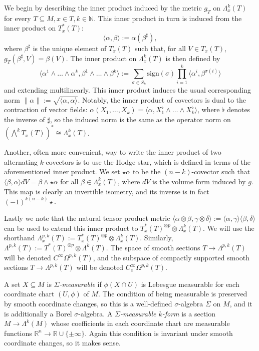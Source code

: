 \documentclass[11pt]{article}
\newcommand{\iprod}[1]{\langle #1 \rangle}
\begin{document}
We begin by describing the inner product induced by the metric $g_T$ on $\Lambda^k_x(T)$ for every $T \subseteq M, x \in T, k \in \mathbb{N}$. This inner product in turn is induced from the inner product on $T^*_x(T)$:
\[
\iprod{\alpha,\beta} := \alpha(\beta^\sharp),
\]
where $\beta^\sharp$ is the unique element of $T_x(T)$ such that, for all $V \in T_x(T)$, $g_T(\beta^\sharp,V) = \beta(V)$. The inner product on $\Lambda^k_x(T)$ is then defined by
\[
\iprod{\alpha^1\wedge\dots\wedge\alpha^k,\beta^1\wedge\dots\wedge\beta^k} := \sum_{\sigma \in S_k} \mathrm{sign}(\sigma)\prod_{i = 1}^k \iprod{\alpha^i,\beta^{\sigma(i)}}
\]
and extending multilinearly. This inner product induces the usual corresponding norm $\|\alpha\| := \sqrt{\iprod{\alpha,\alpha}}$.
 Notably, the inner product of covectors is dual to the contraction of vector fields: $\alpha(X_1,\dots,X_k) = \iprod{\alpha,X_1^\flat\wedge \dots \wedge X_k^\flat}$, where $\flat$ denotes the inverse of $\sharp$, so the induced norm is the same as the operator norm on $(\displaystyle\bigwedge^kT_x(T))^* \cong \Lambda^k_x(T)$. 
 
Another, often more convenient, way to write the inner product of two alternating $k$-covectors is to use the Hodge star, which is defined in terms of the aforementioned inner product. We set $\star \alpha$ to be the $(n-k)$-covector such that $\iprod{\beta,\alpha}dV = \beta\wedge\star\alpha$ for all $\beta \in \Lambda^k_x(T)$, where $dV$ is the volume form induced by $g$. This map is clearly an invertible isometry, and its inverse is in fact $(-1)^{k(n-k)}\star$.

Lastly we note that the natural tensor product metric $\iprod{\alpha \otimes \beta,\gamma \otimes \delta} := \iprod{\alpha,\gamma}\iprod{\beta,\delta}$ can be used to extend this inner product to $T_x^*(T)^{\otimes p} \otimes \Lambda^k_x(T)$. We will use the shorthand $\Lambda^{p,k}_x(T) := T_x^*(T)^{\otimes p}\otimes \Lambda^k_x(T)$.  Similarly, $\Lambda^{p,k}(T) := T^*(T)^{\otimes p}\otimes \Lambda^k(T)$.  The space of smooth sections $T \to \Lambda^{p,k}(T)$ will be denoted $C^\infty\Omega^{p,k}(T)$, and the subspace of compactly supported smooth sections $T \to \Lambda^{p,k}(T)$ will be denoted $C_c^\infty\Omega^{p,k}(T)$.

A set $X \subseteq M$ is \emph{$\Sigma$-measurable} if $\phi(X \cap U)$ is Lebesgue measurable for each coordinate chart $(U,\phi)$ of $M$. The condition of being measurable is preserved by smooth coordinate changes, so this is a well-defined $\sigma$-algebra $\Sigma$ on $M$, and it is additionally a Borel $\sigma$-algebra. A \emph{$\Sigma$-measurable $k$-form} is a section $M \to \Lambda^k(M)$ whose coefficients in each coordinate chart are measurable functions $\mathbb{R}^n \to \mathbb{R} \cup \{\pm \infty\}$. Again this condition is invariant under smooth coordinate changes, so it makes sense. 
\end{document}
